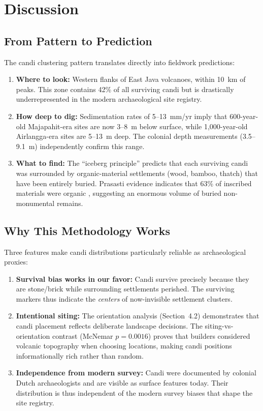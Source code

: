 \documentclass[12pt,a4paper]{article}
\begin{document}
\section{Discussion}

\subsection{From Pattern to Prediction}

The candi clustering pattern translates directly into fieldwork predictions:

\begin{enumerate}
    \item \textbf{Where to look:} Western flanks of East Java volcanoes, within 10~km of peaks. This zone contains 42\% of all surviving candi but is drastically underrepresented in the modern archaeological site registry.
    \item \textbf{How deep to dig:} Sedimentation rates of 5--13~mm/yr imply that 600-year-old Majapahit-era sites are now 3--8~m below surface, while 1,000-year-old Airlangga-era sites are 5--13~m deep. The colonial depth measurements (3.5--9.1~m) independently confirm this range.
    \item \textbf{What to find:} The ``iceberg principle'' predicts that each surviving candi was surrounded by organic-material settlements (wood, bamboo, thatch) that have been entirely buried. Prasasti evidence indicates that 63\% of inscribed materials were organic \citep{amien2026p1}, suggesting an enormous volume of buried non-monumental remains.
\end{enumerate}

\subsection{Why This Methodology Works}

Three features make candi distributions particularly reliable as archaeological proxies:

\begin{enumerate}
    \item \textbf{Survival bias works in our favor:} Candi survive precisely because they are stone/brick while surrounding settlements perished. The surviving markers thus indicate the \emph{centers} of now-invisible settlement clusters.
    \item \textbf{Intentional siting:} The orientation analysis (Section~4.2) demonstrates that candi placement reflects deliberate landscape decisions. The siting-vs-orientation contrast (McNemar $p=0.0016$) proves that builders considered volcanic topography when choosing locations, making candi positions informationally rich rather than random.
    \item \textbf{Independence from modern survey:} Candi were documented by colonial Dutch archaeologists and are visible as surface features today. Their distribution is thus independent of the modern survey biases that shape the site registry.
\end{enumerate}
\end{document}
